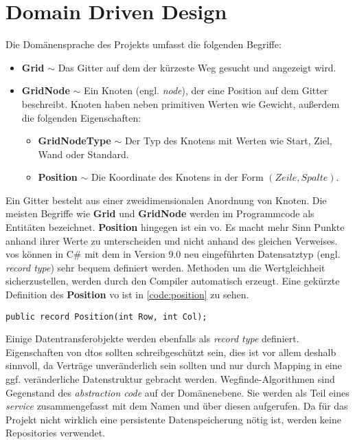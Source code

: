 \part{Domain Driven Design}
Die Domänensprache des Projekts umfasst die folgenden Begriffe:
\begin{itemize}
      \item \textbf{Grid} $\sim$ Das Gitter auf dem der kürzeste Weg gesucht und
            angezeigt wird.
      \item \textbf{GridNode} $\sim$ Ein Knoten (engl. \textit{node}),
            der eine Position auf dem Gitter beschreibt. Knoten haben neben
            primitiven Werten wie Gewicht, außerdem die
            folgenden Eigenschaften:
            \begin{itemize}[topsep=0pt]
                  \item \textbf{GridNodeType} $\sim$ Der Typ des Knotens mit Werten
                        wie Start, Ziel, Wand oder Standard.
                  \item \textbf{Position} $\sim$ Die Koordinate des Knotens in der
                        Form $(Zeile,Spalte)$.
            \end{itemize}
\end{itemize}
Ein Gitter besteht aus einer zweidimensionalen Anordnung von Knoten.
Die meisten Begriffe wie \textbf{Grid} und \textbf{GridNode} werden
im Programmcode als Entitäten bezeichnet.
\textbf{Position} hingegen ist ein \ac{vo}. Es macht mehr Sinn Punkte anhand ihrer
Werte zu unterscheiden und nicht anhand des gleichen Verweises.
\acp{vo} können in C\# mit dem in Version 9.0 neu eingeführten
Datensatztyp (engl. \textit{record type}) sehr bequem definiert werden.
Methoden um die Wertgleichheit sicherzustellen,
werden durch den Compiler automatisch erzeugt.
Eine gekürzte Definition des \textbf{Position} \ac{vo} ist in \autoref{code:position}
zu sehen.
\begin{lstlisting}[caption={Der Datensatztyp einer Koordinate},label={code:position}]
public record Position(int Row, int Col);
\end{lstlisting}
Einige Datentransferobjekte werden ebenfalls als \textit{record type} definiert.
Eigenschaften von \acp{dto} sollten schreibgeschützt sein,
dies ist vor allem deshalb sinnvoll, da Verträge un\-veränderlich sein sollten
und nur durch Mapping in eine ggf. veränderliche Datenstruktur gebracht werden.
Wegfinde-Algorithmen sind Gegenstand des \textit{abstraction code} auf
der Domänenebene. Sie werden als Teil eines \textit{service}
zusammengefasst mit dem Namen  und
über diesen aufgerufen. Da für das Projekt nicht wirklich
eine persistente Datenspeicherung nötig ist, werden keine
Repositories verwendet.